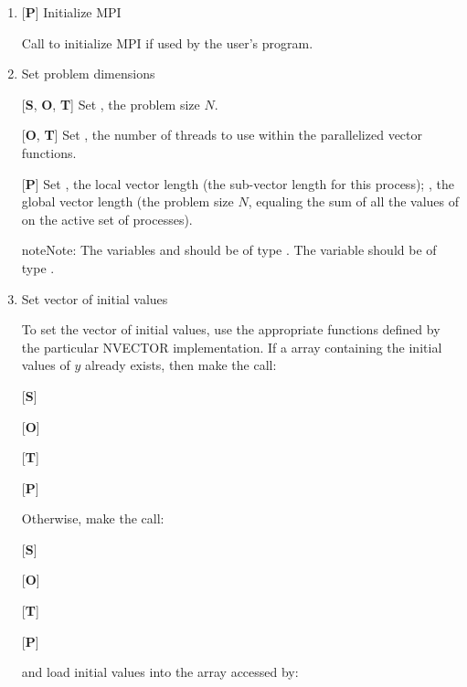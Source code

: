 \documentclass[letterpaper,10pt,english]{sphinxmanual}
\begin{document}
\begin{enumerate}
\item {} 
{[}\textbf{P}{]} Initialize MPI

Call  to initialize MPI if used by the user's program.

\item {} 
Set problem dimensions

{[}\textbf{S}, \textbf{O}, \textbf{T}{]} Set , the problem size $N$.

{[}\textbf{O}, \textbf{T}{]} Set , the number of threads to use
within the parallelized vector functions.

{[}\textbf{P}{]} Set , the local vector length (the sub-vector length
for this process); , the global vector length (the problem size
$N$, equaling the sum of all the values of  on the
active set of processes).

\begin{notice}{note}{Note:}
The variables  and  should be of type
.  The variable  should be of type
.
\end{notice}

\item {} 
Set vector of initial values

To set the vector  of initial values, use the appropriate
functions defined by the particular NVECTOR implementation.  If a
 array  containing the initial values of $y$
already exists, then make the call:

{[}\textbf{S}{]} 

{[}\textbf{O}{]} 

{[}\textbf{T}{]} 

{[}\textbf{P}{]} 

Otherwise, make the call:

{[}\textbf{S}{]} 

{[}\textbf{O}{]} 

{[}\textbf{T}{]} 

{[}\textbf{P}{]} 

and load initial values into the array accessed by:


\end{enumerate}
\end{document}
